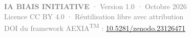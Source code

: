\documentclass[11pt,a4paper,openany]{book}
\begin{document}
\vspace{1cm}

\begin{center}
{\small\textcolor{gray}{
  \textbf{IA BIAIS INITIATIVE} · Version 1.0 · Octobre 2026\\
  Licence CC BY 4.0 · Réutilisation libre avec attribution\\
  DOI du framework AEXIA\textsuperscript{TM} : \href{https://doi.org/10.5281/zenodo.23126471}{10.5281/zenodo.23126471}
}}
\end{center}
\end{document}
